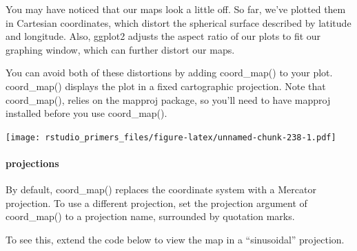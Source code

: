 \documentclass[
]{article}
\newenvironment{Shaded}{\begin{snugshade}}{\end{snugshade}}
\newcommand{\AttributeTok}[1]{\textcolor[rgb]{0.77,0.63,0.00}{#1}}
\newcommand{\FunctionTok}[1]{\textcolor[rgb]{0.00,0.00,0.00}{#1}}
\newcommand{\NormalTok}[1]{#1}
\newcommand{\SpecialCharTok}[1]{\textcolor[rgb]{0.00,0.00,0.00}{#1}}
\begin{document}
You may have noticed that our maps look a little off. So far, we've
plotted them in Cartesian coordinates, which distort the spherical
surface described by latitude and longitude. Also, ggplot2 adjusts the
aspect ratio of our plots to fit our graphing window, which can further
distort our maps.

You can avoid both of these distortions by adding coord\_map() to your
plot. coord\_map() displays the plot in a fixed cartographic projection.
Note that coord\_map(), relies on the mapproj package, so you'll need to
have mapproj installed before you use coord\_map().

\begin{Shaded}
\end{Shaded}

\texttt{[image: rstudio\_primers\_files/figure-latex/unnamed-chunk-238-1.pdf]}

\hypertarget{projections}{%
\paragraph{projections}\label{projections}}

By default, coord\_map() replaces the coordinate system with a Mercator
projection. To use a different projection, set the projection argument
of coord\_map() to a projection name, surrounded by quotation marks.

To see this, extend the code below to view the map in a ``sinusoidal''
projection.

\begin{Shaded}
\end{Shaded}
\end{document}
